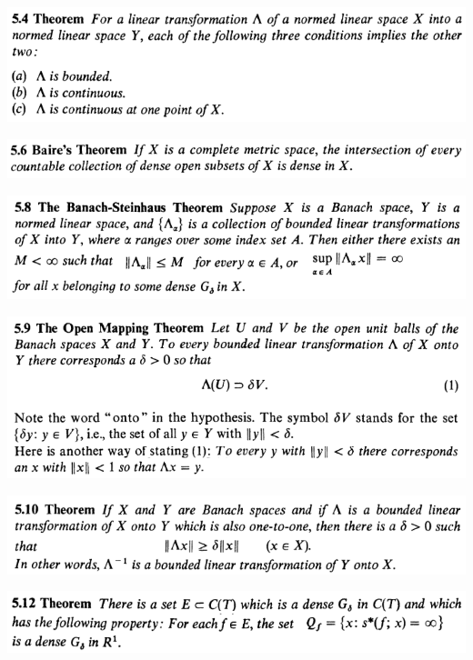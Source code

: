 \documentclass[12pt]{article}
\begin{document}
		\begin{center}
		\includegraphics{5ponto4}
		\end{center}

		\begin{center}
		\includegraphics{5ponto6}
		\end{center}

		\begin{center}
		\includegraphics{5ponto8}
		\end{center}

		\begin{center}
		\includegraphics{5ponto9}
		\end{center}

		\begin{center}
		\includegraphics{5ponto10}
		\end{center}

		\begin{center}
		\includegraphics{5ponto12}
		\end{center}
\end{document}
